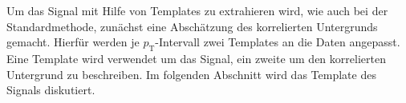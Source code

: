Um das Signal mit Hilfe von Templates zu extrahieren wird, wie auch bei der Standardmethode, zunächst eine Abschätzung des korrelierten Untergrunds gemacht.
Hierfür werden je $p_\text{T}$-Intervall zwei Templates an die Daten angepasst.
Eine Template wird verwendet um das Signal, ein zweite um den korrelierten Untergrund zu beschreiben.
\newline
Im folgenden Abschnitt wird das Template des Signals diskutiert. 